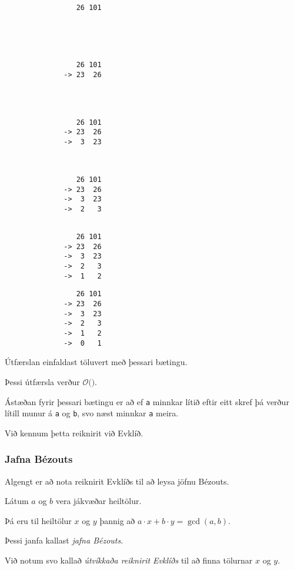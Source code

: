 { \begin{verbatim}
                 26 101





\end{verbatim}}
{ \begin{verbatim}
                 26 101
              -> 23  26




\end{verbatim}}
{ \begin{verbatim}
                 26 101
              -> 23  26
              ->  3  23



\end{verbatim}}
{ \begin{verbatim}
                 26 101
              -> 23  26
              ->  3  23
              ->  2   3


\end{verbatim}}
{ \begin{verbatim}
                 26 101
              -> 23  26
              ->  3  23
              ->  2   3
              ->  1   2

\end{verbatim}}
{ \begin{verbatim}
                 26 101
              -> 23  26
              ->  3  23
              ->  2   3
              ->  1   2
              ->  0   1
\end{verbatim}}

{
	\only<1>{\gcdA}
	\only<2>{\gcdB}
	\only<3>{\gcdC}
	\only<4>{\gcdD}
	\only<5>{\gcdE}
	\only<6>{\gcdF}
}

{
	{
		\item<1-> Útfærslan einfaldast töluvert með þessari bætingu.
		\item<2->[] 
		\item<3-> Þessi útfærsla verður $\mathcal{O}($\onslide<4->{$\log \max(a, b)$}$)$.
		\item<4-> Ástæðan fyrir þessari bætingu er að ef \texttt{a} minnkar lítið eftir eitt skref
					þá verður lítill munur á \texttt{a} og \texttt{b}, svo næst minnkar \texttt{a} meira.
		\item<5-> Við kennum þetta reiknirit við Evklíð.
	}
}

{
	\frametitle{Jafna Bézouts}
	{
		\item<1-> Algengt er að nota reiknirit Evklíðs til að leysa jöfnu Bézouts.
		\item<2-> Látum $a$ og $b$ vera jákvæðar heiltölur.
		\item<3-> Þá eru til heiltölur $x$ og $y$ þannig að $a \cdot x + b \cdot y = \gcd(a, b)$.
		\item<4-> Þessi janfa kallast \emph{jafna Bézouts}.
		\item<5-> Við notum svo kallað \emph{útvíkkaða reiknirit Evklíðs} til að finna tölurnar $x$ og $y$.
		\item<6->[] 
	}
}

